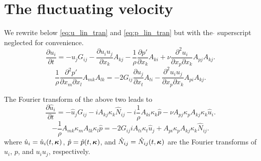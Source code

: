 \documentclass[oneside,a4paper,11pt]{report}
\newcommand{\pfluc}{p'}
\newcommand{\uifluc}{u_i}
\newcommand{\ujfluc}{u_j}
\begin{document}
\section{The fluctuating velocity}
We rewrite below \cref{eq:u_lin_tran} and \cref{eq:p_lin_tran} but with the $\mathring{}$ superscript neglected for convenience. 
\begin{equation}
\frac{\partial \uifluc }{\partial t } = -\ujfluc G_{ij} - \frac{\partial \uifluc \ujfluc}{\partial x_k} A_{kj} - \frac{1}{\rho} \frac{\partial \pfluc }{\partial x_k} A_{ki} + \nu \frac{ \partial^2 \uifluc}{\partial x_p \partial x_k} A_{pj} A_{kj}.
\end{equation}
\begin{equation}
\frac{1}{\rho} \frac{\partial^2 \pfluc }{\partial x_m \partial x_l} A_{mk} A_{lk} = -2 G_{ij} \frac{\partial \ujfluc }{\partial x_t} A_{ti} - \frac{\partial^2 \uifluc \ujfluc}{\partial x_p \partial x_k} A_{pi}A_{kj}.
\end{equation}

The Fourier transform of the above two leads to
\begin{equation}
\frac{\partial \hat{u}_i }{\partial t } = -\hat{u}_j G_{ij} - i A_{kj}\kappa_k  \hat{N}_{ij} - i\frac{1}{\rho} A_{ki} \kappa_k  \hat{ p } - \nu  A_{pj}\kappa_p A_{kj}\kappa_k \hat{u}_i.
\end{equation}
\begin{equation}
-\frac{1}{\rho} A_{mk}\kappa_m A_{lk}\kappa_l \hat{ p } = -2 G_{ij} i A_{ti}\kappa_t \hat{u}_j + A_{pi}\kappa_p A_{kj}\kappa_k \hat{N}_{ij}.
\end{equation}
where $\hat{u}_i = \hat{u}_i(t,\boldsymbol\kappa)$, $\hat{p} = \hat{p}(t,\boldsymbol\kappa)$, and $\hat{N}_{ij} = \hat{N}_{ij}(t,\boldsymbol\kappa)$ are the Fourier transforms of $\uifluc$, $p$, and $\uifluc \ujfluc$, respectively. 
\end{document}
